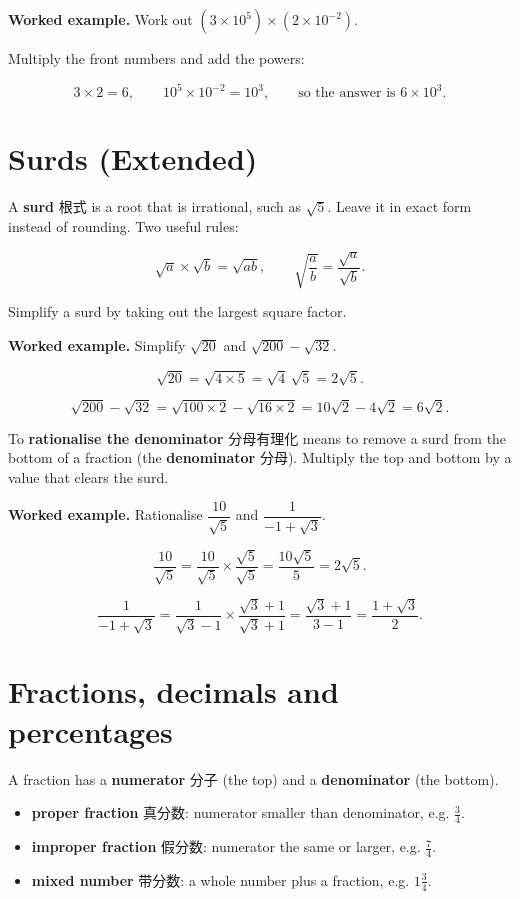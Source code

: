 \documentclass[11pt]{article}
\begin{document}
\textbf{Worked example.} Work out $(3 \times 10^{5}) \times (2 \times 10^{-2})$.

Multiply the front numbers and add the powers:

\[
3 \times 2 = 6, \qquad 10^{5} \times 10^{-2} = 10^{3}, \qquad \text{so the answer is } 6 \times 10^{3}.
\]

\section*{Surds (Extended)}

A \textbf{surd} 根式 is a root that is irrational, such as $\sqrt{5}$. Leave it in exact form instead of rounding. Two useful rules:

\[
\sqrt{a} \times \sqrt{b} = \sqrt{ab}, \qquad \sqrt{\frac{a}{b}} = \frac{\sqrt{a}}{\sqrt{b}}.
\]

Simplify a surd by taking out the largest square factor.

\textbf{Worked example.} Simplify $\sqrt{20}$ and $\sqrt{200} - \sqrt{32}$.

\[
\sqrt{20} = \sqrt{4 \times 5} = \sqrt{4}\,\sqrt{5} = 2\sqrt{5}.
\]

\[
\sqrt{200} - \sqrt{32} = \sqrt{100 \times 2} - \sqrt{16 \times 2} = 10\sqrt{2} - 4\sqrt{2} = 6\sqrt{2}.
\]

To \textbf{rationalise the denominator} 分母有理化 means to remove a surd from the bottom of a fraction (the \textbf{denominator} 分母). Multiply the top and bottom by a value that clears the surd.

\textbf{Worked example.} Rationalise $\dfrac{10}{\sqrt{5}}$ and $\dfrac{1}{-1+\sqrt{3}}$.

\[
\frac{10}{\sqrt{5}} = \frac{10}{\sqrt{5}} \times \frac{\sqrt{5}}{\sqrt{5}} = \frac{10\sqrt{5}}{5} = 2\sqrt{5}.
\]

\[
\frac{1}{-1+\sqrt{3}} = \frac{1}{\sqrt{3}-1} \times \frac{\sqrt{3}+1}{\sqrt{3}+1} = \frac{\sqrt{3}+1}{3-1} = \frac{1+\sqrt{3}}{2}.
\]

\section*{Fractions, decimals and percentages}

A fraction has a \textbf{numerator} 分子 (the top) and a \textbf{denominator} (the bottom).

\begin{itemize}
\item \textbf{proper fraction} 真分数: numerator smaller than denominator, e.g. $\frac{3}{4}$.

\item \textbf{improper fraction} 假分数: numerator the same or larger, e.g. $\frac{7}{4}$.

\item \textbf{mixed number} 带分数: a whole number plus a fraction, e.g. $1\frac{3}{4}$.

\end{itemize}
\end{document}
